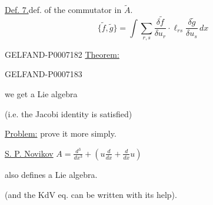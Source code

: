 \underline{Def. 7.}\quad def. of the commutator in \(\widetilde A\).
\[
\{\widetilde f,\widetilde g\}
=\int\sum_{r,s}\frac{\delta\widetilde f}{\delta u_r}\cdot
\ell_{rs}\frac{\delta\widetilde g}{\delta u_s}\,dx
\]

\par\endgroup
\begin{GelfandAdjacentEvidence}{GELFAND-P000718}{2}
\underline{Theorem:}
\end{GelfandAdjacentEvidence}
\begin{GelfandAdjacentEvidence}{GELFAND-P000718}{3}

we get a Lie algebra
\end{GelfandAdjacentEvidence}

(i.e. the Jacobi identity is satisfied)

\underline{Problem:} prove it more simply.

\underline{S. P. Novikov}\qquad
\(A=\frac{d^3}{dx^3}+\left(u\frac{d}{dx}+\frac{d}{dx}u\right)\)

also defines a Lie algebra.

(and the KdV eq. can be written with its help).


